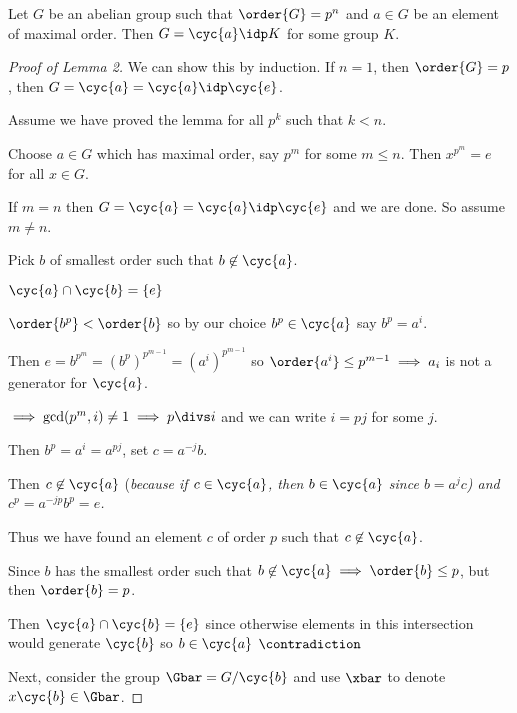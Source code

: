  \begin{lemma}
    Let \(G\) be an abelian group such that \(\order{G}=p^n\) and \(a\in G\) be an element of maximal order. Then \(G = \cyc{a}\idp K\) for some group \(K\).
 \end{lemma}

 \begin{proof}[Proof of Lemma 2]
     We can show this by induction.  If \(n = 1\), then \(\order{G} = p\), then \(G = \cyc{a}=\cyc{a}\idp\cyc{e}\).

     Assume we have proved the lemma for all \(p^k\) such that \(k < n\).

     Choose \(a\in G\) which has maximal order, say \(p^m\) for some \(m\leq n\).  Then \(x^{p^m} = e\) for all \(x\in G\).

     If \(m = n\) then \(G = \cyc{a}=\cyc{a}\idp\cyc{e}\) and we are done.  So assume \(m \neq n\).

     Pick \(b\) of smallest order such that \(b\not\in\cyc{a}\).

     \begin{claim}
     $\cyc{a}\cap \cyc{b} = \{e\}$
     \end{claim}
     \begin{subproof}
         \vspace*{-1em}\(\order{b^p} < \order{b}\) so by our choice \(b^p\in \cyc{a}\) say \(b^p=a^i\).

         Then \(e = b^{p^m} = (b^{p})^{p^{m-1}} = (a^i)^{p^{m-1}}\) so \(\order{a^i}\leq p^{m-1} \implies a_i\) is not a generator for \(\cyc{a}\).

         \(\implies \gcd(p^m, i) \neq 1 \implies p\divs i\) and we can write \(i = pj\) for some \(j\).

         Then \(b^p = a^i = a^{pj}\), set \(c=a^{-j}b\).

         Then \(c\not\in\cyc{a}\) (\it{because if \(c\in\cyc{a}\), then \(b\in\cyc{a}\) since \(b = a^jc\)}) and \(c^p = a^{-jp}b^p = e\).

         Thus we have found an element \(c\) of order \(p\) such that \(c\not\in\cyc{a}\).

         Since \(b\) has the smallest order such that \(b\not\in\cyc{a}\implies \order{b}\leq p\), but then \(\order{b}=p\).

         Then \(\cyc{a}\cap\cyc{b}=\{e\}\) since otherwise elements in this intersection would generate \(\cyc{b}\) so \(b\in\cyc{a}\) \(\contradiction\)
     \end{subproof}
     Next, consider the group \(\Gbar = G / \cyc{b}\) and use \(\xbar\) to denote \(x\cyc{b}\in\Gbar\).


\end{proof}
